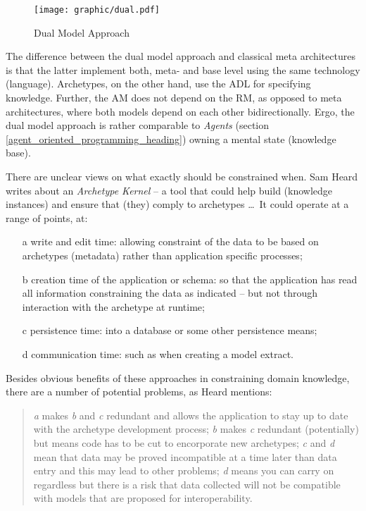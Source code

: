 \begin{figure}[ht]
    \begin{center}
        \texttt{[image: graphic/dual.pdf]}
        \caption{Dual Model Approach \cite{archetypes}}
        \label{dual_figure}
    \end{center}
\end{figure}

The difference between the dual model approach and classical meta architectures
is that the latter implement both, meta- and base level using the same
technology (language). Archetypes, on the other hand, use the ADL for
specifying knowledge. Further, the AM does not depend on the RM, as opposed to
meta architectures, where both models depend on each other bidirectionally.
Ergo, the dual model approach is rather comparable to \emph{Agents} (section
\ref{agent_oriented_programming_heading}) owning a mental state (knowledge base).

There are unclear views on what exactly should be constrained when. Sam Heard
\cite{openehrtechnical} writes about an \emph{Archetype Kernel} -- a tool that
could help build (knowledge instances) and ensure that (they) comply to
archetypes \ldots\ It could operate at a range of points, at:

\begin{itemize}
    \item[a] write and edit time: allowing constraint of the data to be based
        on archetypes (metadata) rather than application specific processes;
    \item[b] creation time of the application or schema: so that the
        application has read all information constraining the data as indicated
        -- but not through interaction with the archetype at runtime;
    \item[c] persistence time: into a database or some other persistence means;
    \item[d] communication time: such as when creating a model extract.
\end{itemize}

Besides obvious benefits of these approaches in constraining domain knowledge,
there are a number of potential problems, as Heard mentions:

\begin{quote}
    \emph{a} makes \emph{b} and \emph{c} redundant and allows the application
    to stay up to date with the archetype development process; \emph{b} makes
    \emph{c} redundant (potentially) but means code has to be cut to
    encorporate new archetypes; \emph{c} and \emph{d} mean that data may be
    proved incompatible at a time later than data entry and this may lead to
    other problems; \emph{d} means you can carry on regardless but there is a
    risk that data collected will not be compatible with models that are
    proposed for interoperability.
\end{quote}

